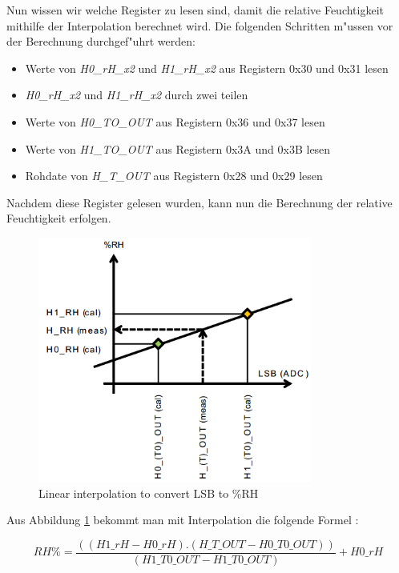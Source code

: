 Nun wissen wir welche Register zu lesen sind, damit die relative 
Feuchtigkeit mithilfe der Interpolation berechnet wird. Die folgenden 
Schritten m"ussen vor der Berechnung durchgef"uhrt werden:

\begin{itemize}
	\item Werte von \textit{H0\_rH\_x2} und \textit{H1\_rH\_x2} aus 
	Registern 0x30 und 0x31 lesen 
	\item \textit{H0\_rH\_x2} und \textit{H1\_rH\_x2} durch zwei teilen
	\item Werte von \textit{H0\_TO\_OUT} aus Registern 0x36 und 0x37 
	lesen 
	\item Werte von \textit{H1\_TO\_OUT} aus Registern 0x3A und 0x3B 
	lesen
	\item Rohdate von \textit{H\_T\_OUT} aus Registern 0x28 und 0x29 
	lesen
\end{itemize}

Nachdem diese Register gelesen wurden, kann nun die Berechnung der 
relative Feuchtigkeit erfolgen.

\begin{figure}[h]
	\centering
	\includegraphics[width=9cm]{source/images/rH}
	\caption{Linear interpolation to convert LSB to \%RH 
	\cite{HTS221}}\label{fig:rH}
\end{figure}

Aus Abbildung \ref{fig:rH} bekommt man mit Interpolation die folgende 
Formel \cite{HTS221}:

\begin{center}
	\[
	RH\% = \frac{((H1\_rH - H0\_rH) . (H\_T\_OUT - 
	H0\_T0\_OUT))}{(H1\_T0\_OUT - H1\_T0\_OUT) } + H0\_rH  
	\]\label{HumFormel}
\end{center}

\vspace{10cm}
